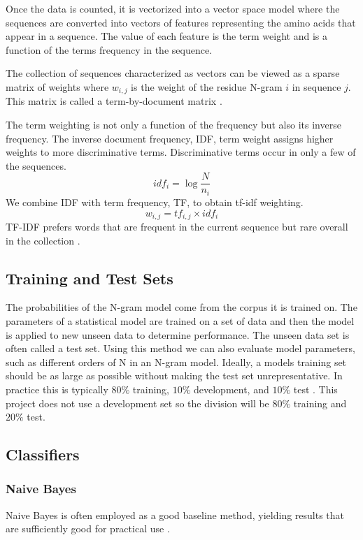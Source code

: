 \documentclass[10pt,letterpaper]{article}
\begin{document}
	Once the data is counted, it is vectorized into a vector space model where the sequences are converted into vectors of features representing the amino acids that appear in a sequence. The value of each feature is the term weight and is a function of the terms frequency in the sequence.
	
	The collection of sequences characterized as vectors can be viewed as a sparse matrix of weights where $w_{i,j}$ is the weight of the residue N-gram $i$ in sequence $j$. This matrix is called a term-by-document matrix \cite{jurafsky}.  
	
	The term weighting is not only a function of the frequency but also its inverse frequency. The inverse document frequency, IDF, term weight assigns higher weights to more discriminative terms. Discriminative terms occur in only a few of the sequences. 
	$$ idf_i = \log {\frac{N}{n_i}}$$ We combine IDF with term frequency, TF, to obtain tf-idf weighting. $$w_{i,j} = tf_{i,j} \times idf_i$$ TF-IDF prefers words that are frequent in the current sequence but rare overall in the collection \cite{jurafsky}.
	
	\subsection*{Training and Test Sets}
	The probabilities of the N-gram model come from the corpus it is trained on. The parameters of a statistical model are trained on a set of data and then the model is applied to new unseen data to determine performance. The unseen data set is often called a test set. Using this method we can also evaluate model parameters, such as different orders of N in an N-gram model. Ideally, a models training set should be as large as possible without making the test set unrepresentative. In practice this is typically $80\%$ training, $10\%$ development, and $10\%$ test \cite{jurafsky}. This project does not use a development set so the division will be $80\%$ training and $20\%$ test. 
	
	\subsection*{Classifiers}
	\subsubsection*{Naive Bayes}
	Naive Bayes is often employed as a good baseline method, yielding results that are sufficiently good for practical use \cite{jurafsky}.
	
\end{document}
